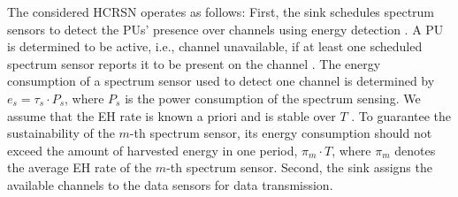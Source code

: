 \documentclass[journal]{IEEEtran} \ifCLASSINFOpdf
\begin{document}
The considered HCRSN operates as follows: First, the sink schedules spectrum sensors to detect the PUs' presence over channels using energy detection \cite{Zhang2014}. A PU is determined to be active, i.e., channel unavailable, if at least one scheduled spectrum sensor reports it to be present on the channel \cite{Deng2012}. The energy consumption of a spectrum sensor used to detect one channel is determined by $e_s = \tau_s \cdot P_s$, where $P_s$ is the power consumption of the spectrum sensing. We assume that the EH rate is known a priori and is stable over $T$ \cite{Zhang2013}. To guarantee the sustainability of the $m$-th spectrum sensor, its energy consumption should not exceed the amount of harvested energy in one period, $\pi_m \cdot T$, where $\pi_m$ denotes the average EH rate of the $m$-th spectrum sensor. Second, the sink assigns the available channels to the data sensors for data transmission.
\end{document}
